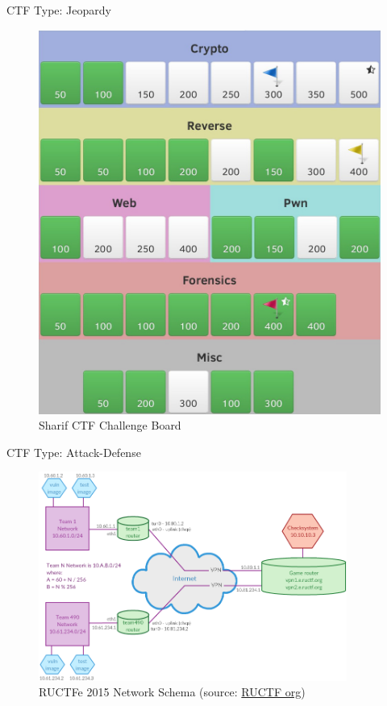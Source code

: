 \begin{frame}
  {CTF Type: Jeopardy}

  \begin{figure}[h]
    \centering
    \includegraphics[height=0.8\textheight]{./images/sharifctf-challenges.jpg}
    \caption{\footnotesize{}Sharif CTF Challenge Board}
    \label{fig:jeopardyboard}
  \end{figure}
\end{frame}

\begin{frame}
  {CTF Type: Attack-Defense}

  \begin{figure}[h]
    \centering
    \includegraphics[width=0.9\textwidth]{./images/ructf-network.png}
    \caption{\footnotesize
      RUCTFe 2015 Network Schema (source:
      \href{https://ructf.org/e/2015/network.html}{RUCTF org}) }
  \end{figure}
\end{frame}

